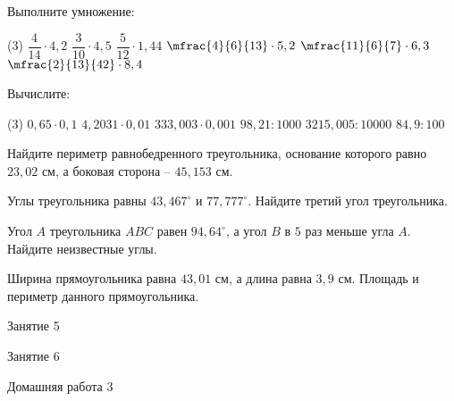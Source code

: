 \begin{homework}[number=2]
	\begin{listofex}
		\item Выполните умножение:
		\begin{tasks}(3)
			\task \( \dfrac{4}{14}\cdot4,2 \)
			\task\( \dfrac{3}{10}\cdot4,5 \)
			\task\( \dfrac{5}{12}\cdot1,44 \)
			\task \( \mfrac{4}{6}{13}\cdot5,2 \)
			\task \( \mfrac{11}{6}{7}\cdot6,3 \)
			\task \( \mfrac{2}{13}{42}\cdot 8,4 \)
		\end{tasks}
		\item Вычислите: \begin{tasks}(3)
			\task \( 0,65\cdot0,1 \)
			\task \( 4,2031\cdot0,01 \)
			\task \( 333,003\cdot0,001 \)
			\task \( 98,21:1000 \)
			\task \( 3215,005:10000 \)
			\task \( 84,9:100 \)
		\end{tasks}
		\item Найдите периметр равнобедренного треугольника, основание которого равно \( 23,02 \) см, а боковая сторона – \( 45,153 \) см.
		\item Углы треугольника равны \( 43,467^{\circ} \) и \( 77,777^{\circ} \). Найдите третий угол треугольника.
		\item Угол \( A \) треугольника \( ABC \) равен \( 94,64^{\circ} \), а угол \( B \) в \( 5 \) раз меньше угла \( A \). Найдите неизвестные углы.
		\item Ширина прямоугольника равна \( 43,01 \) см, а длина равна \( 3,9 \) см. Площадь и периметр данного прямоугольника.
	\end{listofex}
\end{homework}

\begin{class}[number=5]
	\begin{listofex}
		\item Занятие 5
	\end{listofex}
\end{class}

\begin{class}[number=6]
	\begin{listofex}
		\item Занятие 6
	\end{listofex}
\end{class}

\begin{homework}[number=3]
	\begin{listofex}
		\item Домашняя работа 3
	\end{listofex}
\end{homework}

